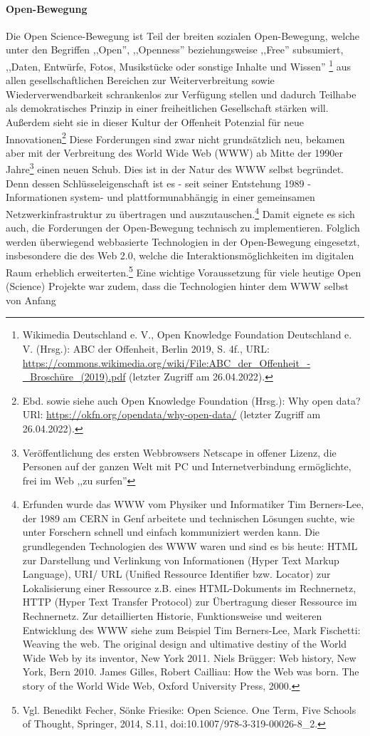 \paragraph{Open-Bewegung} Die Open Science-Bewegung ist Teil der breiten sozialen Open-Bewegung, welche unter den Begriffen ,,Open'', ,,Openness'' beziehungsweise ,,Free'' subsumiert, ,,Daten, Entwürfe, Fotos, Musikstücke oder sonstige Inhalte und Wissen'' \footnote{Wikimedia Deutschland e. V., Open Knowledge Foundation Deutschland e. V. (Hrsg.): ABC der Offenheit, Berlin 2019, S. 4f., URL: \url{https://commons.wikimedia.org/wiki/File:ABC_der_Offenheit_-_Broschüre_(2019).pdf} (letzter Zugriff am 26.04.2022).} aus allen gesellschaftlichen Bereichen zur Weiterverbreitung sowie Wiederverwendbarkeit schrankenlos zur Verfügung stellen und dadurch Teilhabe als demokratisches Prinzip in einer freiheitlichen Gesellschaft stärken will. Außerdem sieht sie in dieser Kultur der Offenheit Potenzial für neue Innovationen\footnote{Ebd. sowie siehe auch Open Knowledge Foundation (Hrsg.): Why open data? URl: \url{https://okfn.org/opendata/why-open-data/} (letzter Zugriff am 26.04.2022).} Diese Forderungen sind zwar nicht grundsätzlich neu, bekamen aber mit der Verbreitung des World Wide Web (WWW) ab Mitte der 1990er Jahre\footnote{Veröffentlichung des ersten Webbrowsers Netscape in offener Lizenz, die Personen auf der ganzen Welt mit PC und Internetverbindung ermöglichte, frei im Web ,,zu surfen''} einen neuen Schub. Dies ist in der Natur des WWW selbst begründet. Denn dessen Schlüsseleigenschaft ist es - seit seiner Entstehung 1989 - Informationen system- und plattformunabhängig in einer gemeinsamen Netzwerkinfrastruktur zu übertragen und auszutauschen.\footnote{Erfunden wurde das WWW vom Physiker und Informatiker Tim Berners-Lee, der 1989 am CERN in Genf arbeitete und technischen Lösungen suchte, wie unter Forschern schnell und einfach kommuniziert werden kann. Die grundlegenden Technologien des WWW waren und sind es bis heute: HTML zur Darstellung und Verlinkung von Informationen (Hyper Text Markup Language), URI/ URL (Unified Ressource Identifier bzw. Locator) zur Lokalisierung einer Ressource z.B. eines HTML-Dokuments im Rechnernetz, HTTP (Hyper Text Transfer Protocol) zur Übertragung dieser Ressource im Rechnernetz. Zur detaillierten Historie, Funktionsweise und weiteren Entwicklung des WWW siehe zum Beispiel Tim Berners-Lee, Mark Fischetti: Weaving the web. The original design and ultimative destiny of the World Wide Web by its inventor, New York 2011. Niels Brügger: Web history, New York, Bern 2010. James Gilles, Robert Cailliau: How the Web was born. The story of the World Wide Web, Oxford University Press, 2000.} Damit eignete es sich auch, die Forderungen der Open-Bewegung technisch zu implementieren. Folglich werden überwiegend webbasierte Technologien in der Open-Bewegung eingesetzt, insbesondere die des Web 2.0, welche die Interaktionsmöglichkeiten im digitalen Raum erheblich erweiterten.\footnote{Vgl. Benedikt Fecher, Sönke Friesike: Open Science. One Term, Five Schools of Thought, Springer, 2014, S.11, doi:10.1007/978-3-319-00026-8\_2.} Eine wichtige Voraussetzung für viele heutige Open (Science) Projekte war zudem, dass die Technologien hinter dem WWW selbst von Anfang 